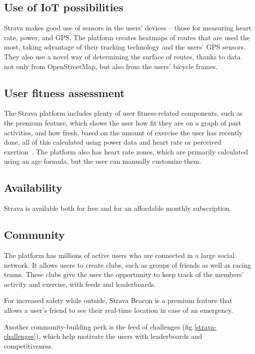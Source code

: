 \subsection*{Use of IoT possibilities}
Strava makes good use of sensors in the users' devices -- those for measuring heart rate, power, and GPS.
The platform creates heatmaps of routes that are used the most, taking advantage of their tracking technology and the users' GPS sensors.
They also use a novel way of determining the surface of routes, thanks to data not only from OpenStreetMap, but also from the users' bicycle frames.

\subsection*{User fitness assessment}
The Strava platform includes plenty of user fitness-related components, such as the premium  feature,
which shows the user how fit they are on a graph of past activities, and how fresh, based on the amount of exercise the user has recently done,
all of this calculated using power data and heart rate or perceived exertion~\cite{strava-fitness-freshness}.
The platform also has heart rate zones, which are primarily calculated using an age formula, but the user can manually customize them.
\subsection*{Availability}
Strava is available both for free and for an affordable monthly subscription.
\subsection*{Community}
The platform has millions of active users who are connected in a large social network.
It allows users to create clubs, such as groups of friends as well as racing teams.
These clubs give the user the opportunity to keep track of the members' activity and exercise, with feeds and leaderboards.

For increased safety while outside, Strava Beacon is a premium feature that allows a user's friend to see their real-time location in case of an emergency.

Another community-building perk is the feed of challenges (fig.\ref{strava-challenges}), which help motivate the users with leaderboards and competitiveness.

